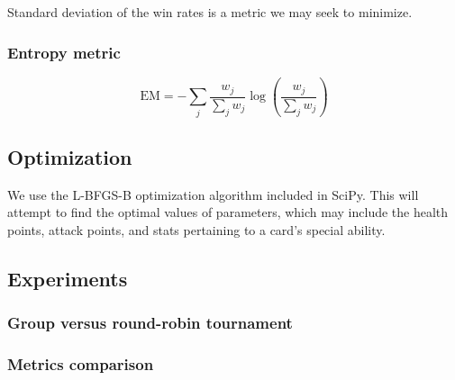 Standard deviation of the win rates is a metric we may seek to minimize.

\subsubsection{Entropy metric}

\begin{equation}
	\mathrm{EM} = -\sum_j \frac{w_j}{\sum_j w_j} \log\left(\frac{w_j}{\sum_j w_j}\right)
\end{equation}

\subsection{Optimization}

We use the L-BFGS-B optimization algorithm included in SciPy. This will attempt to find the optimal values of 
parameters, which may include the health points, attack points, and stats pertaining to a 
card's special ability.

\subsection{Experiments}

\subsubsection{Group versus round-robin tournament}

\subsubsection{Metrics comparison}